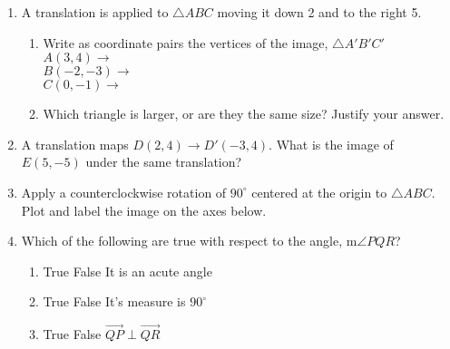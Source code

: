 \documentclass[12pt, twoside]{article}
\begin{document}
\begin{enumerate}[itemsep=0.5cm]
\newpage
\item A translation is applied to $\triangle ABC$ moving it down 2 and to the right 5.
\begin{enumerate}
  \item Write as coordinate pairs the vertices of the image, $\triangle A'B'C'$ \\[0.3cm]
  $A(3,4) \rightarrow$ \\[0.7cm]
  $B(-2,-3) \rightarrow$ \\[0.7cm]
  $C(0,-1) \rightarrow$ \\[0.2cm]
  \item Which triangle is larger, or are they the same size? Justify your answer.
\end{enumerate} \vspace{3cm}


\item A translation maps $D(2,4) \rightarrow D'(-3,4)$. What is the image of $E(5,-5)$ under the same translation? \vspace{2cm}

\item Apply a counterclockwise rotation of $90^\circ$ centered at the origin to $\triangle ABC$. Plot and label the image on the axes below.
  \begin{flushright}
  \end{flushright}

\newpage

\item Which of the following are true with respect to the angle, m$\angle PQR$?
  \begin{multicols}{2}
    \begin{enumerate}
      \item True \quad False \quad It is an acute angle
      \item True \quad False \quad It's measure is $90^\circ$
      \item True \quad False \quad $\overrightarrow{QP} \perp \overrightarrow{QR}$ 
    \end{enumerate}
    \columnbreak
  \end{multicols}


\end{enumerate}
\end{document}
